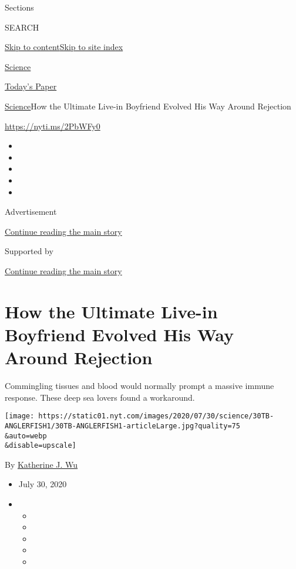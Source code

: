 Sections

SEARCH

\protect\hyperlink{site-content}{Skip to
content}\protect\hyperlink{site-index}{Skip to site index}

\href{https://www.nytimes.com/section/science}{Science}

\href{https://myaccount.nytimes.com/auth/login?response_type=cookie\&client_id=vi}{}

\href{https://www.nytimes.com/section/todayspaper}{Today's Paper}

\href{/section/science}{Science}\textbar{}How the Ultimate Live-in
Boyfriend Evolved His Way Around Rejection

\url{https://nyti.ms/2PbWFy0}

\begin{itemize}
\item
\item
\item
\item
\item
\end{itemize}

Advertisement

\protect\hyperlink{after-top}{Continue reading the main story}

Supported by

\protect\hyperlink{after-sponsor}{Continue reading the main story}

\hypertarget{how-the-ultimate-live-in-boyfriend-evolved-his-way-around-rejection}{%
\section{How the Ultimate Live-in Boyfriend Evolved His Way Around
Rejection}\label{how-the-ultimate-live-in-boyfriend-evolved-his-way-around-rejection}}

Commingling tissues and blood would normally prompt a massive immune
response. These deep sea lovers found a workaround.

\texttt{[image: https://static01.nyt.com/images/2020/07/30/science/30TB-ANGLERFISH1/30TB-ANGLERFISH1-articleLarge.jpg?quality=75\\\&auto=webp\\\&disable=upscale]}

By \href{https://www.nytimes.com/by/katherine-j--wu}{Katherine J. Wu}

\begin{itemize}
\item
  July 30, 2020
\item
  \begin{itemize}
  \item
  \item
  \item
  \item
  \item
  \end{itemize}
\end{itemize}

